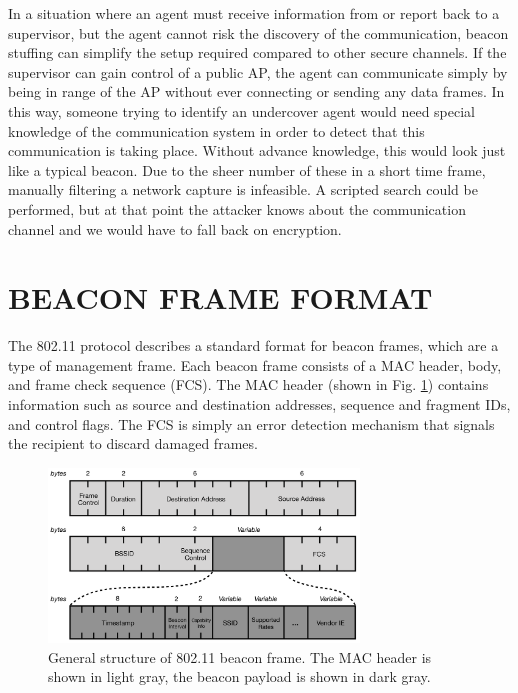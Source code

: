 \documentclass[letterpaper, 10 pt, conference]{ieeeconf}  %
\begin{document}
In a situation where an agent must receive information from or report back to a supervisor, but the agent cannot risk the discovery of the communication, beacon stuffing can simplify the setup required compared to other secure channels. If the supervisor can gain control of a public AP, the agent can communicate simply by being in range of the AP without ever connecting or sending any data frames.  In this way, someone trying to identify an undercover agent would need special knowledge of the communication system in order to detect that this communication is taking place.  Without advance knowledge, this would look just like a typical beacon.  Due to the sheer number of these in a short time frame, manually filtering a network capture is infeasible. A scripted search could be performed, but at that point the attacker knows about the communication channel and we would have to fall back on encryption.


\section{BEACON FRAME FORMAT}

The 802.11 protocol describes a standard format for beacon frames, which are a type of management frame.  Each beacon frame consists of a MAC header, body, and frame check sequence (FCS).  The MAC header (shown in Fig. \ref{fig:beacon}) contains information such as source and destination addresses, sequence and fragment IDs, and control flags.  The FCS is simply an error detection mechanism that signals the recipient to discard damaged frames.

\begin{figure}[ht]
    \includegraphics[width=3.25in]{beaconFrame.png}
    \caption{General structure of 802.11 beacon frame.  The MAC header is shown in light gray, the beacon payload is shown in dark gray.}
    \label{fig:beacon}
\end{figure}
\end{document}
